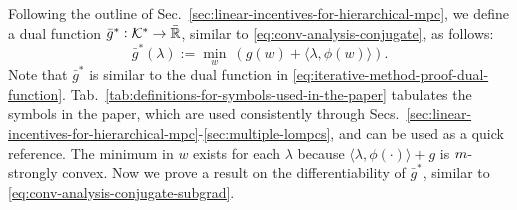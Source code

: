 
Following the outline of Sec.~\ref{sec:linear-incentives-for-hierarchical-mpc}, we define a dual function $\bar{g}^*: \mathcal{K}^* \rightarrow \bar{\mathbb{R}}$, similar to \eqref{eq:conv-analysis-conjugate}, as follows:
\begin{equation}
\label{eq:linear-convex-dual}
    \bar{g}^*(\lambda) := \textstyle{\min}_w \ (g(w) + \langle \lambda, \phi(w) \rangle).
\end{equation}
Note that $\bar{g}^*$ is similar to the dual function in \eqref{eq:iterative-method-proof-dual-function}.
Tab.~\ref{tab:definitions-for-symbols-used-in-the-paper} tabulates the symbols in the paper, which are used consistently through Secs.~\ref{sec:linear-incentives-for-hierarchical-mpc}-\ref{sec:multiple-lompcs}, and can be used as a quick reference.
The minimum in $w$ exists for each $\lambda$ because $\langle \lambda, \phi(\cdot)\rangle + g$ is $m$-strongly convex.
Now we prove a result on the differentiability of $\bar{g}^*$, similar to \eqref{eq:conv-analysis-conjugate-subgrad}.



